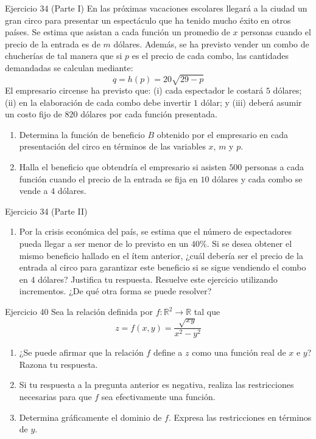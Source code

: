 \documentclass[aspectratio=169, 10pt]{beamer}
\begin{document}
\begin{frame}{Ejercicio 34 (Parte I)}
  \small
  En las próximas vacaciones escolares llegará a la ciudad un gran circo para presentar un espectáculo que ha tenido mucho éxito en otros países. Se estima que asistan a cada función un promedio de $x$ personas cuando el precio de la entrada es de $m$ dólares. Además, se ha previsto vender un combo de chucherías de tal manera que si $p$ es el precio de cada combo, las cantidades demandadas se calculan mediante:
  \[
    q = h(p) = 20\sqrt{29 - p}
  \]
  El empresario circense ha previsto que: (i) cada espectador le costará $5$ dólares; (ii) en la elaboración de cada combo debe invertir $1$ dólar; y (iii) deberá asumir un costo fijo de $820$ dólares por cada función presentada.

  \medskip
  \begin{enumerate}
    \item[(A)] Determina la función de beneficio $B$ obtenido por el empresario en cada presentación del circo en términos de las variables $x$, $m$ y $p$.
    \item[(B)] Halla el beneficio que obtendría el empresario si asisten $500$ personas a cada función cuando el precio de la entrada se fija en $10$ dólares y cada combo se vende a $4$ dólares.
  \end{enumerate}
  \vfill
\end{frame}

\begin{frame}{Ejercicio 34 (Parte II)}
  \small
  \begin{enumerate}
    \item[(C)] Por la crisis económica del país, se estima que el número de espectadores pueda llegar a ser menor de lo previsto en un $40\%$. Si se desea obtener el mismo beneficio hallado en el ítem anterior, ¿cuál debería ser el precio de la entrada al circo para garantizar este beneficio si se sigue vendiendo el combo en $4$ dólares? Justifica tu respuesta. Resuelve este ejercicio utilizando incrementos. ¿De qué otra forma se puede resolver?
  \end{enumerate}
  \vfill
\end{frame}

\begin{frame}{Ejercicio 40}
  \small
  Sea la relación definida por $f : \mathbb{R}^2 \longrightarrow \mathbb{R}$ tal que
  \[
    z = f(x,y) = \frac{\sqrt{xy}}{x^2 - y^2}
  \]
  \begin{enumerate}
    \item[(A)] ¿Se puede afirmar que la relación $f$ define a $z$ como una función real de $x$ e $y$? Razona tu respuesta.
    \item[(B)] Si tu respuesta a la pregunta anterior es negativa, realiza las restricciones necesarias para que $f$ sea efectivamente una función.
    \item[(C)] Determina gráficamente el dominio de $f$. Expresa las restricciones en términos de $y$.
  \end{enumerate}
  \vfill
\end{frame}
\end{document}
